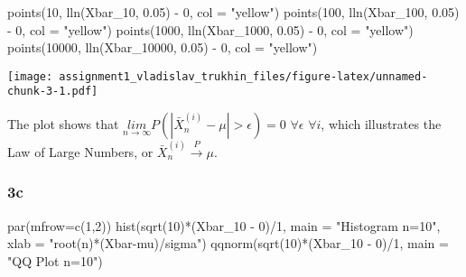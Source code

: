 \documentclass[
]{article}
\newenvironment{Shaded}{\begin{snugshade}}{\end{snugshade}}
\newcommand{\AttributeTok}[1]{\textcolor[rgb]{0.77,0.63,0.00}{#1}}
\newcommand{\DecValTok}[1]{\textcolor[rgb]{0.00,0.00,0.81}{#1}}
\newcommand{\FloatTok}[1]{\textcolor[rgb]{0.00,0.00,0.81}{#1}}
\newcommand{\FunctionTok}[1]{\textcolor[rgb]{0.00,0.00,0.00}{#1}}
\newcommand{\NormalTok}[1]{#1}
\newcommand{\SpecialCharTok}[1]{\textcolor[rgb]{0.00,0.00,0.00}{#1}}
\newcommand{\StringTok}[1]{\textcolor[rgb]{0.31,0.60,0.02}{#1}}
\begin{document}
\begin{Shaded}
\begin{Highlighting}[]
\FunctionTok{points}\NormalTok{(}\DecValTok{10}\NormalTok{, }\FunctionTok{lln}\NormalTok{(Xbar\_10, }\FloatTok{0.05}\NormalTok{) }\SpecialCharTok{{-}} \DecValTok{0}\NormalTok{, }\AttributeTok{col =} \StringTok{"yellow"}\NormalTok{)}
\FunctionTok{points}\NormalTok{(}\DecValTok{100}\NormalTok{, }\FunctionTok{lln}\NormalTok{(Xbar\_100, }\FloatTok{0.05}\NormalTok{) }\SpecialCharTok{{-}} \DecValTok{0}\NormalTok{, }\AttributeTok{col =} \StringTok{"yellow"}\NormalTok{)}
\FunctionTok{points}\NormalTok{(}\DecValTok{1000}\NormalTok{, }\FunctionTok{lln}\NormalTok{(Xbar\_1000, }\FloatTok{0.05}\NormalTok{) }\SpecialCharTok{{-}} \DecValTok{0}\NormalTok{, }\AttributeTok{col =} \StringTok{"yellow"}\NormalTok{)}
\FunctionTok{points}\NormalTok{(}\DecValTok{10000}\NormalTok{, }\FunctionTok{lln}\NormalTok{(Xbar\_10000, }\FloatTok{0.05}\NormalTok{) }\SpecialCharTok{{-}} \DecValTok{0}\NormalTok{, }\AttributeTok{col =} \StringTok{"yellow"}\NormalTok{)}
\end{Highlighting}
\end{Shaded}

\texttt{[image: assignment1\_vladislav\_trukhin\_files/figure-latex/unnamed-chunk-3-1.pdf]}

The plot shows that
\(\underset{n \rightarrow \infty}{lim}P(|\bar{X}_n^{(i)} - \mu| > \epsilon) = 0\)
\(\forall \epsilon\) \(\forall i\), which illustrates the Law of Large
Numbers, or \(\bar{X}_n^{(i)} \overset{P}{\rightarrow} \mu\).

\hypertarget{c-1}{%
\subsubsection{3c}\label{c-1}}

\begin{Shaded}
\begin{Highlighting}[]
\FunctionTok{par}\NormalTok{(}\AttributeTok{mfrow=}\FunctionTok{c}\NormalTok{(}\DecValTok{1}\NormalTok{,}\DecValTok{2}\NormalTok{))}
\FunctionTok{hist}\NormalTok{(}\FunctionTok{sqrt}\NormalTok{(}\DecValTok{10}\NormalTok{)}\SpecialCharTok{*}\NormalTok{(Xbar\_10 }\SpecialCharTok{{-}} \DecValTok{0}\NormalTok{)}\SpecialCharTok{/}\DecValTok{1}\NormalTok{, }\AttributeTok{main =} \StringTok{"Histogram n=10"}\NormalTok{, }\AttributeTok{xlab =} \StringTok{"root(n)*(Xbar{-}mu)/sigma"}\NormalTok{)}
\FunctionTok{qqnorm}\NormalTok{(}\FunctionTok{sqrt}\NormalTok{(}\DecValTok{10}\NormalTok{)}\SpecialCharTok{*}\NormalTok{(Xbar\_10 }\SpecialCharTok{{-}} \DecValTok{0}\NormalTok{)}\SpecialCharTok{/}\DecValTok{1}\NormalTok{, }\AttributeTok{main =} \StringTok{"QQ Plot n=10"}\NormalTok{)}
\end{Highlighting}
\end{Shaded}
\end{document}
